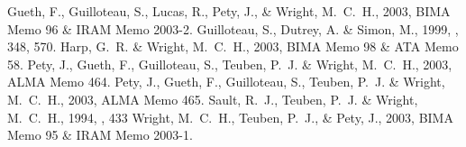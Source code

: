 \documentclass[11pt,twoside]{article}  %
\newcommand{\ALMA}{\textrm{ALMA}}
\begin{document}
%
% 
%
%
\begin{references}
 Gueth, F., Guilloteau, S., Lucas, R., Pety, J., \&
    Wright, M.~C.~H., 2003, BIMA Memo 96 \& IRAM Memo 2003-2.
 Guilloteau, S., Dutrey, A. \& Simon, M., 1999, \aap, 348, 570.
 Harp, G.~R. \& Wright, M.~C.~H., 2003, BIMA Memo 98 \& 
    ATA Memo 58.
 Pety, J., Gueth, F., Guilloteau, S., Teuben, P.~J. \&
    Wright, M.~C.~H., 2003, \ALMA{} Memo 464.
 Pety, J., Gueth, F., Guilloteau, S., Teuben, P.~J. \&
    Wright, M.~C.~H., 2003, \ALMA{} Memo 465.
 Sault, R.~J., Teuben, P.~J. \& Wright, M.~C.~H., 1994, \adassiv, 433
 Wright, M.~C.~H., Teuben, P.~J., \& Pety, J., 2003,
     BIMA Memo 95 \& IRAM Memo 2003-1.
\end{references}

\end{document}
